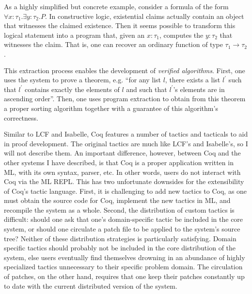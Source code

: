 
As a highly simplified but concrete example, consider a formula of the
form $\forall x{:}\tau_1.\exists y{:}\tau_2.P$.
In constructive logic, existential claims actually contain an object that
witnesses the claimed existence.
Then it seems possible to transform this logical statement into a program that,
given an $x{:}\tau_1$, computes the $y{:}\tau_2$ that witnesses the claim.
That is, one can recover an ordinary function of type $\tau_1 \to \tau_2$.

This extraction process enables the development of \emph{verified algorithms}.
First, one uses the system to prove a theorem, e.g. ``for any list $l$, there
exists a list $l^\prime$ such that $l^\prime$ contains exactly the elements of
$l$ and such that $l^\prime$'s elements are in ascending order''.
Then, one uses program extraction to obtain from this theorem a proper sorting
algorithm together with a guarantee of this algorithm's correctness.

Similar to LCF and Isabelle, Coq features a number of tactics and tacticals to
aid in proof development.
The original tactics are much like LCF's and Isabelle's, so I will not describe
them.
An important difference, however, between Coq and the other systems I have
described, is that Coq is a proper application written in ML\footnotemark,
with its own syntax, parser, etc.
%
%
In other words, users do not interact with Coq via the ML REPL.
This has two unfortunate downsides for the extensibility of Coq's tactic
language.
First, it is challenging to add new tactics to Coq, as one must obtain the
source code for Coq, implement the new tactics in ML, and recompile the system
as a whole.
Second, the distribution of custom tactics is difficult: should one ask that
one's domain-specific tactic be included in the core system, or should one
circulate a patch file to be applied to the system's source tree?
Neither of these distribution strategies is particularly satisfying.
Domain specific tactics should probably not be included in the core distribution
of the system, else users eventually find themselves drowning in an abundance of
highly specialized tactics unnecessary to their specific problem domain.
The circulation of patches, on the other hand, requires that one keep their
patches constantly up to date with the current distributed version of the
system.

